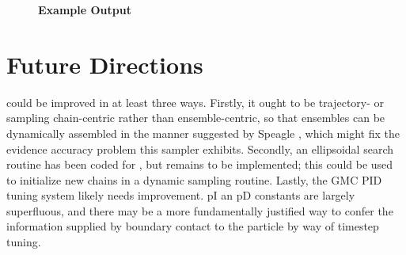\begin{figure}[!h]
    \caption{{\bf Example \protect{} Output}}
    \label{GMCnormoutput}
\end{figure}

\section{Future Directions}

 could be improved in at least three ways. Firstly, it ought to be trajectory- or sampling chain-centric rather than ensemble-centric, so that ensembles can be dynamically assembled in the manner suggested by Speagle \cite{Speagle2020}, which might fix the evidence accuracy problem this sampler exhibits. Secondly, an ellipsoidal search routine has been coded for , but remains to be implemented; this could be used to initialize new chains in a dynamic sampling routine. Lastly, the GMC PID tuning system likely needs improvement. pI an pD constants are largely superfluous, and there may be a more fundamentally justified way to confer the information supplied by boundary contact to the particle by way of timestep tuning.